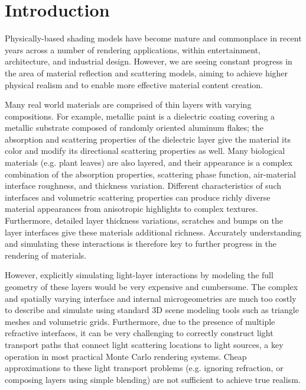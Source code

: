 \section{Introduction}
\label{sec:layeredbsdf:intro}

Physically-based shading models have become mature and commonplace in recent years across a number of rendering applications, within entertainment, architecture, and industrial design. 
However, we are seeing constant progress in the area of material reflection and scattering models, aiming to achieve higher physical realism and to enable more effective material content creation.

Many real world materials are comprised of thin layers with varying compositions. For example, metallic paint is a dielectric coating covering a metallic substrate composed of randomly oriented aluminum flakes; the absorption and scattering properties of the dielectric layer give the material its color and modify its directional scattering properties as well.
Many biological materials (e.g. plant leaves) are also layered, and their appearance is a complex combination of the absorption properties, scattering phase function, air-material interface roughness, and thickness variation.
Different characteristics of such interfaces and volumetric scattering properties can produce richly diverse material appearances from anisotropic highlights to complex textures. Furthermore, detailed layer thickness variations, scratches and bumps on the layer interfaces give these materials additional richness. Accurately understanding and simulating these interactions is therefore key to further progress in the rendering of materials.

However, explicitly simulating light-layer interactions by modeling the full geometry of these layers would be very expensive and cumbersome. 
The complex and spatially varying interface and internal microgeometries are much too costly to describe and simulate using standard 3D scene modeling tools such as triangle meshes and volumetric grids.
Furthermore, due to the presence of multiple refractive interfaces, it can be very challenging to correctly construct light transport paths that connect light scattering locations to light sources, a key operation in most practical Monte Carlo rendering systems. Cheap approximations to these light transport problems (e.g. ignoring refraction, or composing layers using simple blending) are not sufficient to achieve true realism.

